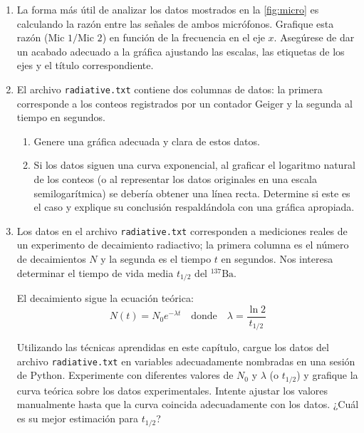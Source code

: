 \documentclass[12pt]{article}
\begin{document}
\begin{problemas}[]
\begin{enumerate}[leftmargin=*]

\item La forma más útil de analizar los datos mostrados en la \autoref{fig:micro}
es calculando la razón entre las señales de ambos micrófonos. Grafique esta razón 
($\text{Mic 1} / \text{Mic 2}$) en función de la frecuencia en el eje $x$. 
Asegúrese de dar un acabado adecuado a la gráfica ajustando las escalas, 
las etiquetas de los ejes y el título correspondiente. 
\item El archivo \texttt{radiative.txt} contiene dos columnas de datos: la primera corresponde a los conteos registrados por un contador Geiger y la segunda al tiempo en segundos.
\begin{enumerate}[label=(\alph*)]
    \item Genere una gráfica adecuada y clara de estos datos.
    \item Si los datos siguen una curva exponencial, al graficar el logaritmo natural de los conteos (o al representar los datos originales en una escala semilogarítmica) se debería obtener una línea recta. Determine si este es el caso y explique su conclusión respaldándola con una gráfica apropiada.
\end{enumerate}
\item Los datos en el archivo \texttt{radiative.txt} 
corresponden a mediciones reales de un experimento de decaimiento radiactivo; la primera columna es el número de decaimientos $N$ y la segunda es el tiempo $t$ en segundos. Nos interesa determinar el tiempo de vida media $t_{1/2}$ del $^{137}\text{Ba}$.

El decaimiento sigue la ecuación teórica:
\[
N(t) = N_0 e^{-\lambda t} \quad \text{donde} \quad \lambda = \frac{\ln 2}{t_{1/2}}
\]

Utilizando las técnicas aprendidas en este capítulo, 
cargue los datos del archivo \texttt{radiative.txt} en 
variables adecuadamente nombradas en una sesión de Python. 
Experimente con diferentes valores de $N_0$ y $\lambda$ (o $t_{1/2}$) y 
grafique la curva teórica sobre los datos experimentales. 
Intente ajustar los valores manualmente hasta que la curva coincida 
adecuadamente con los datos. ¿Cuál es su mejor estimación para $t_{1/2}$?
\end{enumerate}

\end{problemas}
\end{document}

